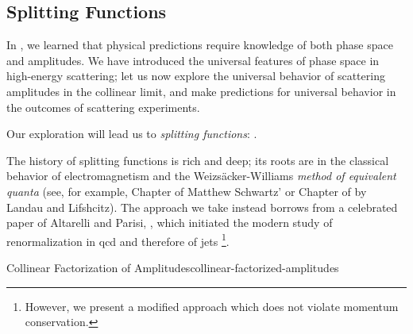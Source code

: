 


\subsection{Splitting Functions}
\label{sec:splitting-functions}
In , we learned that physical predictions require knowledge of both phase space and amplitudes.
%
We have introduced the universal features of phase space in high-energy scattering;
%
let us now explore the universal behavior of scattering amplitudes in the collinear limit, and make predictions for universal behavior in the outcomes of scattering experiments.

Our exploration will lead us to \textit{splitting functions}:
%
.

The history of splitting functions is rich and deep;
%
its roots are in the classical behavior of electromagnetism and the Weizs\"acker-Williams \textit{method of equivalent quanta} (see, for example, Chapter  of Matthew Schwartz' \Reff{} or Chapter  of \Reff{} by Landau and Lifshcitz).
%
The approach we take instead borrows from a celebrated paper of Altarelli and Parisi, \Reff{}, which initiated the modern study of renormalization in \gls{qcd} and therefore of \glspl{jet}%
\footnote{
    However, we present a modified approach which does not violate momentum conservation.
}.



\begin{proposition}{Collinear Factorization of Amplitudes}{collinear-factorized-amplitudes}

\end{proposition}




